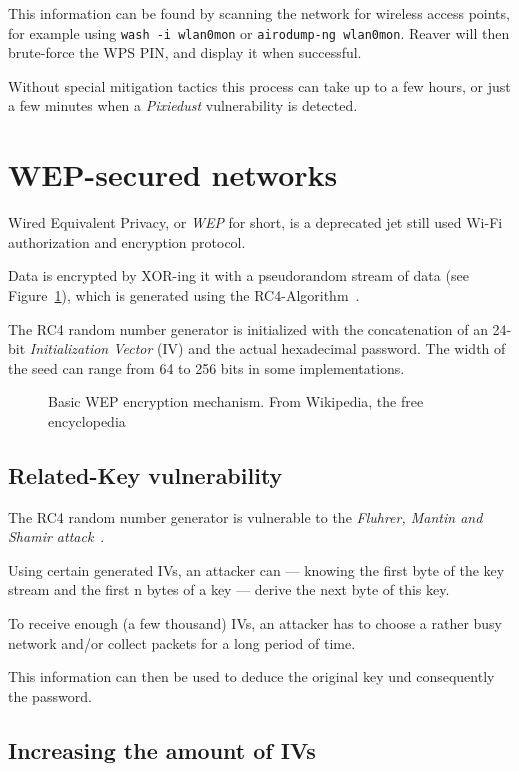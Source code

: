 This information can be found by scanning the network for wireless access points, for example using \lstinline[basicstyle=\ttfamily]{wash -i wlan0mon} or \lstinline[basicstyle=\ttfamily]{airodump-ng wlan0mon}. Reaver will then brute-force the WPS PIN, and display it when successful. 

Without special mitigation tactics this process can take up to a few hours, or just a few minutes when a \emph{Pixiedust} vulnerability is detected.

\section{WEP-secured networks}

Wired Equivalent Privacy, or \emph{WEP} for short, is a deprecated jet still used Wi-Fi authorization and encryption protocol.

Data is encrypted by XOR-ing it with a pseudorandom stream of data (see Figure~\ref{fig:wepmech}), which is generated using the RC4-Algorithm~\cite{WiFi16}.

The RC4 random number generator is initialized with the concatenation of an 24-bit \emph{Initialization Vector} (IV) and the actual hexadecimal password. The width of the seed can range from 64 to 256 bits in some implementations.

\begin{figure}

\caption{Basic WEP encryption mechanism. From Wikipedia, the free encyclopedia~\cite{BHL07}}\label{fig:wepmech}
\end{figure}

\subsection{Related-Key vulnerability}

The RC4 random number generator is vulnerable to the \emph{Fluhrer, Mantin and Shamir attack}~\cite{FMS01}.

Using certain generated IVs, an attacker can --- knowing the first byte of the key stream and the first n bytes of a key --- derive the next byte of this key.

To receive enough (a few thousand) IVs, an attacker has to choose a rather busy network and/or collect packets for a long period of time.

This information can then be used to deduce the original key und consequently the password.

\subsection{Increasing the amount of IVs}

